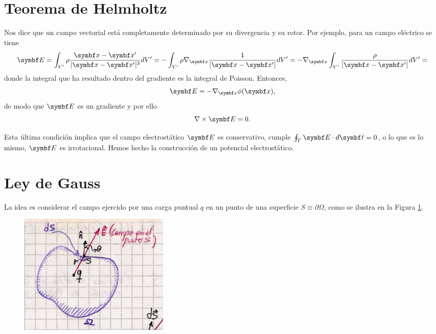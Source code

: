\documentclass[10pt,oneside]{CBFT_book}
\begin{document}
\section{Teorema de Helmholtz}

Nos dice que un campo vectorial está completamente determinado por su divergencia y su rotor.
Por ejemplo, para un campo eléctrico se tiene 
\[
	\vb{E} = \int_{V'} \rho \frac{\vb{x} - \vb{x}'}{|\vb{x} - \vb{x}'|^3} dV' = 
		- \int_{V'} \rho \nabla_{\vb{x}} \frac{ 1 }{|\vb{x} - \vb{x}'|} dV' = 
		- \nabla_{\vb{x}} \int_{V'}   \frac{ \rho }{|\vb{x} - \vb{x}'|} dV' = 
\]
donde la integral que ha resultado dentro del gradiente es la integral de Poisson. Entonces,
\[
	\vb{E} = - \nabla_{\vb{x}} \phi (\vb{x}),
\]
de modo que $\vb{E}$ es un gradiente y por ello 
\[
	\nabla  \times \vb{E} = 0.
\]

Esta última condición implica que el campo electrostático $\vb{E}$ es conservativo, cumple 
$\oint_\Gamma \vb{E}\cdot d\vb{\ell} = 0$, o lo que es lo mismo, $\vb{E}$ es irrotacional.
Hemos hecho la construcción de un potencial electrostático.


\section{Ley de Gauss}

La idea es considerar el campo ejercido por una carga puntual $q$ en un punto de una superficie $S\equiv\partial\Omega$,
como se ilustra en la Figura \ref{fig_ft1_gauss}.

\begin{figure}[htb]
	\begin{center}
	\includegraphics[width=0.35\textwidth]{images/fig_ft1_gauss.jpg}	 
	\end{center}
	\caption{}
	\label{fig_ft1_gauss}
\end{figure} 
\end{document}
